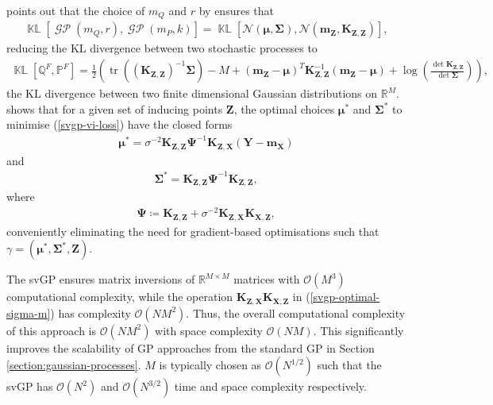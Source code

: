 \documentclass{article}
\newcommand{\KLD}{\operatorname{\mathbb{KL}}}
\newcommand{\tr}{\operatorname{tr}}
\newcommand{\GP}{\operatorname{\mathcal{GP}}}
\numberwithin{equation}{section}
\begin{document}
\cite{matthews2016sparse} points out that the choice of $m_Q$ and $r$ by \cite{titsias2009variational} ensures that
\begin{align}
    \KLD\left[\GP\left(m_Q, r\right), \GP\left(m_P, k\right)\right] = \KLD\left[\mathcal{N}\left(\boldsymbol{\mu}, \mathbf{\Sigma}\right), \mathcal{N}\left(\mathbf{m}_{\mathbf{Z}}, \mathbf{K}_{\mathbf{Z}, \mathbf{Z}}\right)\right],
\end{align}
reducing the KL divergence between two stochastic processes to
\begin{align}
        \KLD\left[\mathbb{Q}^F, \mathbb{P}^F\right]
    = \frac{1}{2}\left( \tr\left(\left(\mathbf{K}_{\mathbf{Z}, \mathbf{Z}}\right)^{-1} \boldsymbol{\Sigma}\right) - M +
    \left(\mathbf{m}_{\mathbf{Z}} - \boldsymbol{\mu}\right)^T \mathbf{K}_{\mathbf{Z}, \mathbf{Z}}^{-1} \left(\mathbf{m}_{\mathbf{Z}} - \boldsymbol{\mu}\right)+ \log\left(\frac{\det\mathbf{K}_{\mathbf{Z}, \mathbf{Z}}}{\det\boldsymbol{\Sigma}}\right) \right),
    \label{kld-closed-form}
\end{align}
the KL divergence between two finite dimensional Gaussian distributions on $\mathbb{R}^M$.
\cite{titsias2009variational} shows that for a given set of inducing points $\mathbf{Z}$, the optimal choices $\boldsymbol{\mu}^*$ and $\mathbf{\Sigma}^*$ to minimise (\ref{svgp-vi-loss}) have the closed forms
\begin{align}
    \label{svgp-optimal-mean}
    \boldsymbol{\mu}^* = \sigma^{-2}\mathbf{K}_{\mathbf{Z}, \mathbf{Z}} \mathbf{\Psi}^{-1}\mathbf{K}_{\mathbf{Z}, \mathbf{X}}  \left(\mathbf{Y} - \mathbf{m}_\mathbf{X}\right)
\end{align}
and
\begin{align}
    \label{svgp-optimal-covariance}
    \mathbf{\Sigma}^* = \mathbf{K}_{\mathbf{Z}, \mathbf{Z}}  \mathbf{\Psi}^{-1}\mathbf{K}_{\mathbf{Z}, \mathbf{Z}},
\end{align}
where
\begin{align}
    \mathbf{\Psi} \coloneqq \mathbf{K}_{\mathbf{Z}, \mathbf{Z}}  + \sigma^{-2}\mathbf{K}_{\mathbf{Z}, \mathbf{X}} \mathbf{K}_{\mathbf{X}, \mathbf{Z}},
    \label{svgp-optimal-sigma-m}
\end{align}
conveniently eliminating the need for gradient-based optimisations such that $\gamma = \left(\boldsymbol{\mu}^*, \mathbf{\Sigma}^*,  \mathbf{Z}\right)$.

The svGP ensures matrix inversions of $\mathbb{R}^{M \times M}$ matrices with $\mathcal{O}\left(M^3\right)$ computational complexity, while the operation $\mathbf{K}_{\mathbf{Z}, \mathbf{X}} \mathbf{K}_{\mathbf{X}, \mathbf{Z}}$ in (\ref{svgp-optimal-sigma-m}) has complexity $\mathcal{O}\left(NM^2\right)$.
Thus, the overall computational complexity of this approach is $\mathcal{O}\left(NM^2\right)$ with space complexity $\mathcal{O}\left(NM\right)$.
This significantly improves the scalability of GP approaches from the standard GP in Section \ref{section:gaussian-processes}. $M$ is typically chosen as $\mathcal{O}(N^{1/2})$ such that the svGP has $\mathcal{O}(N^{2})$ and $\mathcal{O}(N^{3/2})$ time and space complexity respectively.
\end{document}
